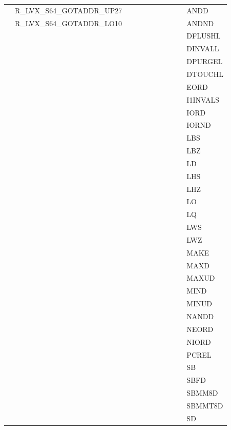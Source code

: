 {\begin{tabular}{|l|l|l|l|l|l|l|l|l|l|l|}
 & \textsf{R\_LVX\_S64\_GOTADDR\_UP27} & & & & & & & & & \textsf{ANDD} \\
 & \textsf{R\_LVX\_S64\_GOTADDR\_LO10} & & & & & & & & & \textsf{ANDND} \\
 & & & & & & & & & & \textsf{DFLUSHL} \\
 & & & & & & & & & & \textsf{DINVALL} \\
 & & & & & & & & & & \textsf{DPURGEL} \\
 & & & & & & & & & & \textsf{DTOUCHL} \\
 & & & & & & & & & & \textsf{EORD} \\
 & & & & & & & & & & \textsf{I1INVALS} \\
 & & & & & & & & & & \textsf{IORD} \\
 & & & & & & & & & & \textsf{IORND} \\
 & & & & & & & & & & \textsf{LBS} \\
 & & & & & & & & & & \textsf{LBZ} \\
 & & & & & & & & & & \textsf{LD} \\
 & & & & & & & & & & \textsf{LHS} \\
 & & & & & & & & & & \textsf{LHZ} \\
 & & & & & & & & & & \textsf{LO} \\
 & & & & & & & & & & \textsf{LQ} \\
 & & & & & & & & & & \textsf{LWS} \\
 & & & & & & & & & & \textsf{LWZ} \\
 & & & & & & & & & & \textsf{MAKE} \\
 & & & & & & & & & & \textsf{MAXD} \\
 & & & & & & & & & & \textsf{MAXUD} \\
 & & & & & & & & & & \textsf{MIND} \\
 & & & & & & & & & & \textsf{MINUD} \\
 & & & & & & & & & & \textsf{NANDD} \\
 & & & & & & & & & & \textsf{NEORD} \\
 & & & & & & & & & & \textsf{NIORD} \\
 & & & & & & & & & & \textsf{PCREL} \\
 & & & & & & & & & & \textsf{SB} \\
 & & & & & & & & & & \textsf{SBFD} \\
 & & & & & & & & & & \textsf{SBMM8D} \\
 & & & & & & & & & & \textsf{SBMMT8D} \\
 & & & & & & & & & & \textsf{SD} \\

\end{tabular}}
